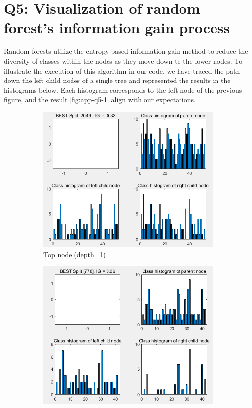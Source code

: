 \section{Q5: Visualization of random forest's information gain process}
\label{subsec:Q5-2}
Random forests utilize the entropy-based information gain method to reduce the diversity of classes within the nodes as they move down to the lower nodes. To illustrate the execution of this algorithm in our code, we have traced the path down the left child nodes of a single tree and represented the results in the histograms below. Each histogram corresponds to the left node of the previous figure, and the result \cref{fig:app-q5-1} align with our expectations.

\begin{figure}
	\centering
	\begin{subfigure}{0.33\linewidth}
		\centering
		\includegraphics[width=\linewidth]{image/q5-app/hist1.png}
		\caption{Top node (depth=1)}
	\end{subfigure}%
	\hfill
	\begin{subfigure}{0.33\linewidth}
		\centering
		\includegraphics[width=\linewidth]{image/q5-app/hist2.png}

\end{subfigure}
\end{figure}
